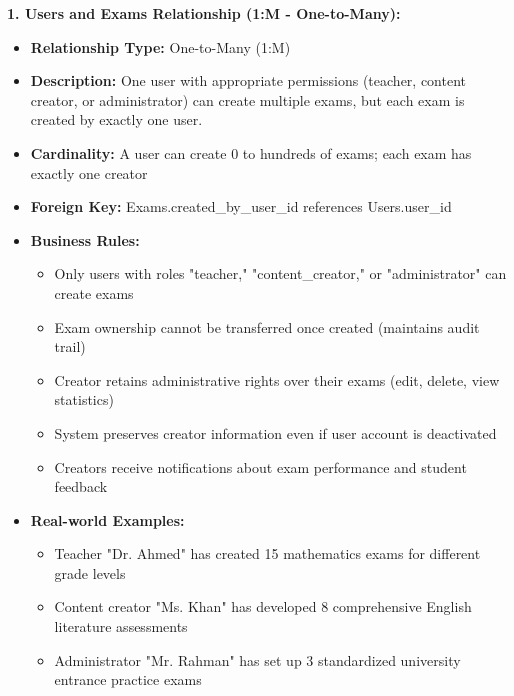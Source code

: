 \documentclass[12pt,a4paper,oneside]{book}
\begin{document}
\textbf{1. Users and Exams Relationship (1:M - One-to-Many):}
\begin{itemize}
    \item \textbf{Relationship Type:} One-to-Many (1:M)
    \item \textbf{Description:} One user with appropriate permissions (teacher, content creator, or administrator) can create multiple exams, but each exam is created by exactly one user.
    \item \textbf{Cardinality:} A user can create 0 to hundreds of exams; each exam has exactly one creator
    \item \textbf{Foreign Key:} Exams.created\_by\_user\_id references Users.user\_id
    \item \textbf{Business Rules:}
        \begin{itemize}
            \item Only users with roles "teacher," "content\_creator," or "administrator" can create exams
            \item Exam ownership cannot be transferred once created (maintains audit trail)
            \item Creator retains administrative rights over their exams (edit, delete, view statistics)
            \item System preserves creator information even if user account is deactivated
            \item Creators receive notifications about exam performance and student feedback
        \end{itemize}
    \item \textbf{Real-world Examples:}
        \begin{itemize}
            \item Teacher "Dr. Ahmed" has created 15 mathematics exams for different grade levels
            \item Content creator "Ms. Khan" has developed 8 comprehensive English literature assessments
            \item Administrator "Mr. Rahman" has set up 3 standardized university entrance practice exams
        \end{itemize}
\end{itemize}
\end{document}
